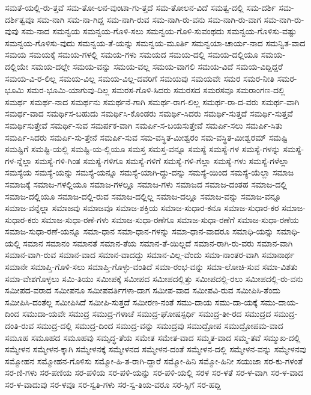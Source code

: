 {ಸಮತೆ-ಯಲ್ಲಿ-ರು-ತ್ತವೆ
ಸಮ-ತೋ-ಲನ-ವುಂಟಾ-ಗು-ತ್ತದೆ
ಸಮ-ತೋಲನ-ವಿದೆ
ಸಮತ್ವ-ದಲ್ಲಿ
ಸಮ-ದರ್ಶಿ
ಸಮ-ದರ್ಶಿತ್ವವೂ
ಸಮ-ನಾಗಿ
ಸಮ-ನಾ-ಗಿದ್ದ
ಸಮ-ನಾಗಿ-ರುವ
ಸಮ-ನಾಗಿ-ರು-ವನು
ಸಮ-ನಾಗಿ-ರು-ವಾಗ
ಸಮ-ನಾಗಿ-ರು-ವುವು
ಸಮ-ನಾದ
ಸಮನ್ವಯ
ಸಮನ್ವಯ-ಗೊಳಿ-ಸಲು
ಸಮನ್ವಯ-ಗೊಳಿ-ಸುವಂಥದು
ಸಮನ್ವಯ-ಗೊಳಿಸು-ವಷ್ಟು
ಸಮನ್ವಯ-ಗೊಳಿಸು-ವುದು
ಸಮನ್ವಯ-ತೆ-ಯನ್ನು
ಸಮನ್ವಯ-ಮೂರ್ತಿ
ಸಮನ್ವಯಾ-ಚಾರ್ಯ-ನಾದ
ಸಮನ್ವಿತ-ವಾದ
ಸಮಯ
ಸಮಯಕ್ಕೆ
ಸಮಯ-ಗಳಲ್ಲಿ
ಸಮಯ-ಗಳು
ಸಮಯದ
ಸಮಯ-ದಲ್ಲಿ
ಸಮಯ-ದಲ್ಲಿಯೂ
ಸಮಯ-ದಲ್ಲಿಯೇ
ಸಮಯ-ದಲ್ಲೇ
ಸಮಯ-ವನ್ನು
ಸಮಯ-ವಲ್ಲ
ಸಮಯ-ವಾಗಲಿ
ಸಮಯ-ವಿದೆ
ಸಮಯ-ವಿದ್ದಿದ್ದರೆ
ಸಮಯ-ವಿ-ರ-ಲಿಲ್ಲ
ಸಮಯ-ವಿಲ್ಲ
ಸಮಯ-ವಿಲ್ಲ-ದವರಿಗೆ
ಸಮಯವು
ಸಮಯವೇ
ಸಮರ
ಸಮರ-ನೀತಿ
ಸಮರ-ಭೂಮಿ
ಸಮರ-ಭೂಮಿ-ಯಾಗುವು-ದಿಲ್ಲ
ಸಮರಸ-ಗೊಳಿ-ಸಿದರು
ಸಮರಸದ
ಸಮರಸವೂ
ಸಮರಾಂಗಣ-ದಲ್ಲಿ
ಸಮರ್ಥ
ಸಮರ್ಥ-ನಾದ
ಸಮರ್ಥನು
ಸಮರ್ಥನೆ-ಗಾಗಿ
ಸಮರ್ಥ-ರಾಗ-ಲಿಲ್ಲ
ಸಮರ್ಥ-ರಾ-ದ-ವರು
ಸಮರ್ಥ-ವಾಗಿ
ಸಮರ್ಥ-ವಾದ
ಸಮರ್ಥಿಸ-ಬಹುದು
ಸಮರ್ಥಿಸಿ-ಕೊಂಡರು
ಸಮರ್ಥಿ-ಸಿದರು
ಸಮರ್ಥಿ-ಸುತ್ತದೆ
ಸಮರ್ಥಿ-ಸುತ್ತವೆ
ಸಮರ್ಥಿಸುತ್ತೇವೆ
ಸಮರ್ಥಿ-ಸುವ
ಸಮರ್ಪಕ-ವಾಗಿ
ಸಮರ್ಪಿ-ಸ-ಬಯಸುತ್ತೇವೆ
ಸಮರ್ಪಿ-ಸಲು
ಸಮರ್ಪಿ-ಸಿತು
ಸಮರ್ಪಿ-ಸಿದರು
ಸಮರ್ಪಿ-ಸು-ತ್ತೇನೆ
ಸಮರ್ಪಿ-ಸುವ
ಸಮ-ವಸ್ಥಿತ-ಮೀಶ್ವರಂ
ಸಮ-ವಸ್ಥಿತ-ಮೀಶ್ವರಮ್
ಸಮಷ್ಟಿ
ಸಮಷ್ಟಿಗೆ
ಸಮಷ್ಟಿ-ಯಲ್ಲಿ
ಸಮಷ್ಟಿ-ಯ-ಲ್ಲಿಯೂ
ಸಮಸ್ತ
ಸಮಸ್ತ-ವನ್ನೂ
ಸಮಸ್ಯೆ
ಸಮಸ್ಯೆ-ಗಳ
ಸಮಸ್ಯೆ-ಗಳನ್ನು
ಸಮಸ್ಯೆ-ಗಳ-ನ್ನೆಲ್ಲಾ
ಸಮಸ್ಯೆ-ಗಳಿ-ಗಿಂತ
ಸಮಸ್ಯೆ-ಗಳಿಗೂ
ಸಮಸ್ಯೆ-ಗಳಿಗೆ
ಸಮಸ್ಯೆ-ಗಳಿ-ಗೆಲ್ಲಾ
ಸಮಸ್ಯೆ-ಗಳು
ಸಮಸ್ಯೆ-ಗಳೆಲ್ಲಾ
ಸಮಸ್ಯೆಯ
ಸಮಸ್ಯೆ-ಯನ್ನು
ಸಮಸ್ಯೆ-ಯನ್ನೂ
ಸಮಸ್ಯೆ-ಯಾಗಿ-ದ್ದು-ದನ್ನು
ಸಮಸ್ಯೆ-ಯಿಂದ
ಸಮಸ್ಯೆ-ಯೆಲ್ಲಾ
ಸಮಾಜ
ಸಮಾಜಕ್ಕೆ
ಸಮಾಜ-ಗಳಲ್ಲಿಯೂ
ಸಮಾಜ-ಗಳಲ್ಲೂ
ಸಮಾಜ-ಗಳು
ಸಮಾಜದ
ಸಮಾಜ-ದಂತಹ
ಸಮಾಜ-ದಲ್ಲಿ
ಸಮಾಜ-ದಲ್ಲಿಯೂ
ಸಮಾಜ-ದಲ್ಲಿ-ರುವ
ಸಮಾಜ-ದಲ್ಲಿಲ್ಲ
ಸಮಾಜ-ದಲ್ಲೂ
ಸಮಾಜ-ವನ್ನು
ಸಮಾಜ-ವನ್ನೂ
ಸಮಾಜ-ವನ್ನೆಲ್ಲಾ
ಸಮಾಜವು
ಸಮಾಜವೂ
ಸಮಾಜ-ಶಕ್ತಿಯ
ಸಮಾಜ-ಸುಧಾರ-ಕನೂ
ಸಮಾಜ-ಸುಧಾರ-ಕರ
ಸಮಾಜ-ಸುಧಾರ-ಕರು
ಸಮಾಜ-ಸುಧಾ-ರಣೆ-ಗಳು
ಸಮಾಜ-ಸುಧಾ-ರಣೆಗೂ
ಸಮಾಜ-ಸುಧಾ-ರಣೆಗೆ
ಸಮಾಜ-ಸುಧಾ-ರಣೆಯ
ಸಮಾಜ-ಸುಧಾ-ರಣೆ-ಯನ್ನೂ
ಸಮಾ-ಧಾನ
ಸಮಾ-ಧಾನ-ಗಳನ್ನು
ಸಮಾ-ಧಾನ-ವಾದರೂ
ಸಮಾಧಿ-ಯನ್ನು
ಸಮಾಧಿ-ಯಲ್ಲಿ
ಸಮಾನ
ಸಮಾನಂ
ಸಮಾನತೆ
ಸಮಾನ-ತೆಯ
ಸಮಾನ-ತೆ-ಯಿಲ್ಲದೆ
ಸಮಾನ-ರಾಗಿ-ರು-ವರು
ಸಮಾನ-ವಾಗಿ
ಸಮಾನ-ವಾಗಿ-ರುವ
ಸಮಾನ-ವಾದ
ಸಮಾನ-ವಾದದ್ದು
ಸಮಾನ-ವಿಲ್ಲ-ವೆಂದು
ಸಮಾ-ನಾಂತರ-ವಾಗಿ
ಸಮಾನಾರ್ಥ
ಸಮಾನೇ
ಸಮಾಪ್ತಿ-ಗೊಳಿ-ಸಲು
ಸಮಾಪ್ತಿ-ಗೊಳ್ಳು-ವಂತಿದೆ
ಸಮಾ-ರಂಭ-ವನ್ನು
ಸಮಾ-ಲೋಚಿ-ಸುವ
ಸಮಾ-ವಿಶತು
ಸಮಾ-ವೇಶಗೊಳ್ಳಲು
ಸಮಿ-ತಿಯು
ಸಮೀಪಕ್ಕೆ
ಸಮೀಪದ
ಸಮೀಪದಲ್ಲಿತ್ತು
ಸಮೀಪದಲ್ಲಿ-ರಲು
ಸಮೀಪದಲ್ಲಿ-ರು-ವನು
ಸಮೀಪದ-ವರಾದ
ಸಮೀಪನೂ
ಸಮೀಪವರ್ತಿಗಳಾ-ದಾಗ
ಸಮೀಪ-ವಾದ
ಸಮೀಪವಿ-ರುವ
ಸಮೀಪಿಸಿ-ತೆಂದು
ಸಮೀಪಿಸಿ-ದಂತೆಲ್ಲ
ಸಮೀಪಿಸಿದೆ
ಸಮೀಪಿ-ಸುತ್ತದೆ
ಸಮೀರಣ-ನಂತೆ
ಸಮು-ದಾಯ
ಸಮು-ದಾ-ಯಕ್ಕೆ
ಸಮು-ದಾಯ-ದಿಂದ
ಸಮುದಾ-ಯವೇ
ಸಮುದ್ರ
ಸಮುದ್ರ-ಗಳಾಚೆ
ಸಮುದ್ರ-ಘೋಷಸ್ಪರ್ಧಿ
ಸಮುದ್ರ-ತೀ-ರದ
ಸಮುದ್ರದ
ಸಮುದ್ರ-ದಂತಿ-ರುವ
ಸಮುದ್ರ-ದಲ್ಲಿ
ಸಮುದ್ರ-ದಿಂದ
ಸಮುದ್ರ-ವನ್ನು
ಸಮುದ್ರವು
ಸಮುದ್ರೋಪ
ಸಮುದ್ರೋಪಮ-ವಾದ
ಸಮೂಹ
ಸಮೂಹದ
ಸಮೂಹವು
ಸಮೃದ್ಧ-ತೆಯ
ಸಮೇತ
ಸಮೇತ-ವಾದ
ಸಮ್ಮತ-ವಾದ
ಸಮ್ಮ-ತವೆ
ಸಮ್ಮುಖ-ದಲ್ಲಿ
ಸಮ್ಮೇಳನ
ಸಮ್ಮೇಳನ-ಕ್ಕಾಗಿ
ಸಮ್ಮೇಳನಕ್ಕೆ
ಸಮ್ಮೇಳನದ
ಸಮ್ಮೇಳನ-ದಂತೆ
ಸಮ್ಮೇಳನ-ದಲ್ಲಿ
ಸಮ್ಮೇಳನ-ವನ್ನು
ಸಮ್ಮೇಳನವು
ಸಮ್ಮೋಹನ
ಸಮ್ಮೋಹನ-ಗೊಳಿಸು
ಸಮ್ಮೋ-ಹಿ-ತ-ರಾಗಿ-ದ್ದಾರೆ
ಸಮ್ಮೋ-ಹಿನಿ
ಸಮ್ಮೋ-ಹಿನೀ
ಸಯುಜಾ
ಸರ-ಕು-ಗಳಂತೆ
ಸರ-ಣಿ-ಗಳು
ಸರ-ಪಣಿಯ
ಸರ-ಪಳಿಯ
ಸರ-ಪಳಿ-ಯನ್ನು
ಸರ-ಪಳಿ-ಯಲ್ಲಿ
ಸರಳ
ಸರ-ಳತೆ
ಸರ-ಳ-ವಾಗಿ
ಸರ-ಳ-ವಾದ
ಸರ-ಳ-ವಾದುವು
ಸರ-ಳವೂ
ಸರ-ಸ್ವತಿ-ಗಳು
ಸರ-ಸ್ವ-ತಿಯ-ವರೂ
ಸರ-ಸ್ಸಿಗೆ
ಸರ-ಹದ್ದಿ
}
